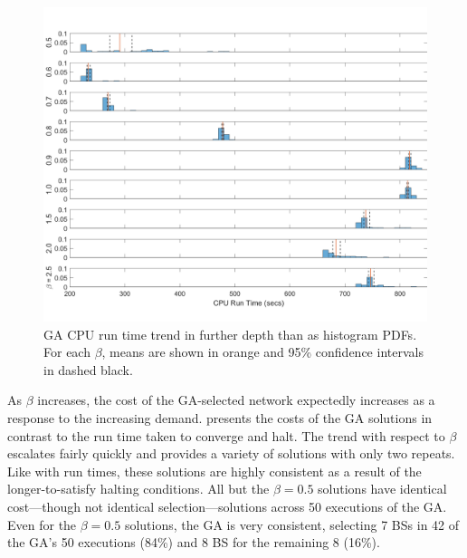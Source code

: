 \documentclass[12pt,dvipsnames]{report}
\begin{document}
\begin{figure}[p]
	\centering
	\includegraphics[angle=90,origin=c,height=0.8\textheight]{Figures/CaseI_GARunTime50_9HistogramsTall}
	\caption[Case I GA CPU run time histogram PDFs]{GA CPU run time trend in further depth than  as histogram PDFs.  For each $\beta$, means are shown in orange and 95\% confidence intervals in dashed black.}
	\label{fig:CaseI_GARunTimeHists}
\end{figure}

As $\beta$ increases, the cost of the GA-selected network expectedly increases as a response to the increasing demand.   presents the costs of the GA solutions in contrast to the run time taken to converge and halt.  The trend with respect to $\beta$ escalates fairly quickly and provides a variety of solutions with only two repeats.  Like with run times, these solutions are highly consistent as a result of the longer-to-satisfy halting conditions.  All but the $\beta = 0.5$ solutions have identical cost---though not identical selection---solutions across 50 executions of the GA.  Even for the $\beta = 0.5$ solutions, the GA is very consistent, selecting 7 BSs in 42 of the GA's 50 executions (84\%) and 8 BS for the remaining 8 (16\%).
\end{document}
